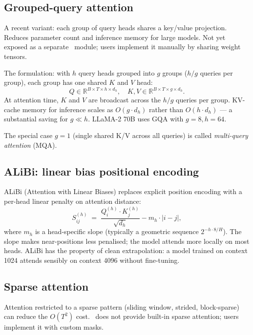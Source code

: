 \subsection{Grouped-query attention}
\label{ssec:attention:gqa}

A recent variant: each group of query heads shares a key/value
projection. Reduces parameter count and inference memory for
large models. Not yet exposed as a separate \Lucid\ module; users
implement it manually by sharing weight tensors.

The formulation: with $h$ query heads grouped into $g$ groups
($h / g$ queries per group), each group has one shared $K$ and
$V$ head:
\[
  Q \in \mathbb{R}^{B \times T \times h \times d_h},
  \quad
  K, V \in \mathbb{R}^{B \times T \times g \times d_h}.
\]
At attention time, $K$ and $V$ are broadcast across the $h / g$
queries per group. KV-cache memory for inference scales as
$O(g \cdot d_h)$ rather than $O(h \cdot d_h)$ --- a substantial
saving for $g \ll h$. LLaMA-2 70B uses GQA with $g = 8, h = 64$.

The special case $g = 1$ (single shared K/V across all queries)
is called \emph{multi-query attention} (MQA).

\subsection{ALiBi: linear bias positional encoding}
\label{ssec:attention:alibi}

ALiBi (Attention with Linear Biases) replaces explicit position
encoding with a per-head linear penalty on attention distance:
\[
  S_{ij}^{(h)} \;=\; \frac{Q_i^{(h)} \cdot K_j^{(h)}}{\sqrt{d_h}} - m_h \cdot |i - j|,
\]
where $m_h$ is a head-specific slope (typically a geometric
sequence $2^{-h \cdot 8 / H}$). The slope makes near-positions
less penalised; the model attends more locally on most heads.
ALiBi has the property of clean extrapolation: a model trained
on context 1024 attends sensibly on context 4096 without
fine-tuning.

\subsection{Sparse attention}
\label{ssec:attention:sparse}

Attention restricted to a sparse pattern (sliding window,
strided, block-sparse) can reduce the $O(T^2)$ cost. \Lucid\ does
not provide built-in sparse attention; users implement it with
custom masks.


